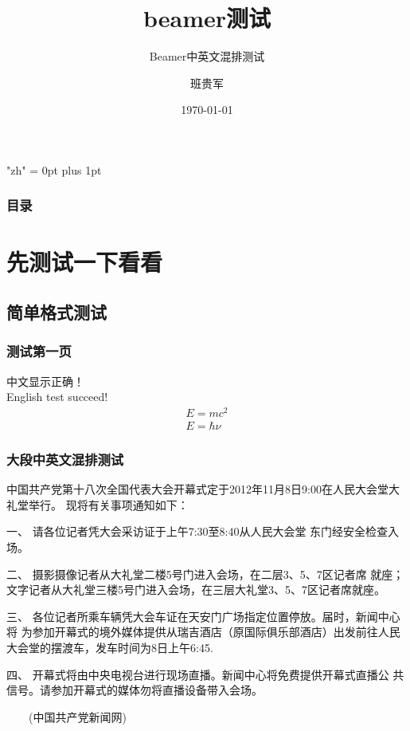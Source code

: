 \documentclass[presentation]{beamer}
\title{beamer测试}
\subtitle{Beamer中英文混排测试}
\author{班贵军}
\institute{北京邮电大学理学院}
\date{\today}
\begin{document}
 
 
 
\XeTeXlinebreaklocale "zh"  %
\XeTeXlinebreakskip = 0pt plus 1pt %
 
 
\begin{frame} 
\titlepage 
 
 
\end{frame} 
 
 
\begin{frame} 
\frametitle{目录} 
    \tableofcontents     %
 
 
\end{frame} 
 
 
 
 
\section{先测试一下看看} 
\subsection{简单格式测试} 
 
 
\begin{frame} 
   \frametitle{测试第一页} 
 
 
 
 
   中文显示正确！\\ 
English test succeed!\\ 
\begin{align}\label{eq:ei} 
    E=mc^2\\ 
    E=\hbar \nu 
\end{align} 
 
 
\end{frame} 
 
 
 
 
\begin{frame}[allowframebreaks] 
\frametitle{大段中英文混排测试} 
中国共产党第十八次全国代表大会开幕式定于2012年11月8日9:00在人民大会堂大礼堂举行。 
现将有关事项通知如下： 
 
 
一、 请各位记者凭大会采访证于上午7:30至8:40从人民大会堂 
东门经安全检查入场。 
 
 
二、 摄影摄像记者从大礼堂二楼5号门进入会场，在二层3、5、7区记者席 
就座；文字记者从大礼堂三楼5号门进入会场，在三层大礼堂3、5、7区记者席就座。 
 
 
三、 各位记者所乘车辆凭大会车证在天安门广场指定位置停放。届时，新闻中心将 
为参加开幕式的境外媒体提供从瑞吉酒店（原国际俱乐部酒店）出发前往人民 
大会堂的摆渡车，发车时间为8日上午6:45. 
 
 
四、 开幕式将由中央电视台进行现场直播。新闻中心将免费提供开幕式直播公 
共信号。请参加开幕式的媒体勿将直播设备带入会场。 
 
 
　　(中国共产党新闻网) 
\end{frame} 
 
\end{document}
